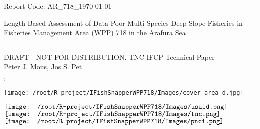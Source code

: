 \begin{titlepage}
\begin{flushleft}
	\textsf{Report Code: AR\_718\_{\today}}
\end{flushleft}

\vspace*{2cm}
\begin{flushright}
        {\Large\textsf{Length-Based Assessment of Data-Poor Multi-Species Deep Slope Fisheries in 
        \\[0.2cm] Fisheries Management Area (WPP) 718 in the Arafura Sea}}\\[0.2cm]
        \rule{\linewidth}{0.5mm}
        \textsf{DRAFT - NOT FOR DISTRIBUTION. TNC-IFCP Technical Paper}\\[2cm]
        \textsf{Peter J. Mous, Jos S. Pet\\[1cm]
        {\MakeUppercase{\MONTH}} {\the\day}, {\the\year}}
\end{flushright}

\begin{center}
\texttt{[image: /root/R-project/IFishSnapperWPP718/Images/cover\_area\_d.jpg]}
\end{center}

\vfill

\noindent
\begin{minipage}[b]{\linewidth}
\noindent
\centering
$\vcenter{\hbox{\texttt{[image: /root/R-project/IFishSnapperWPP718/Images/usaid.png]}}}$
\hfill
$\vcenter{\hbox{\texttt{[image: /root/R-project/IFishSnapperWPP718/Images/tnc.png]}}}$
\hfill
$\vcenter{\hbox{\texttt{[image: /root/R-project/IFishSnapperWPP718/Images/pnci.png]}}}$
\end{minipage}
\end{titlepage}